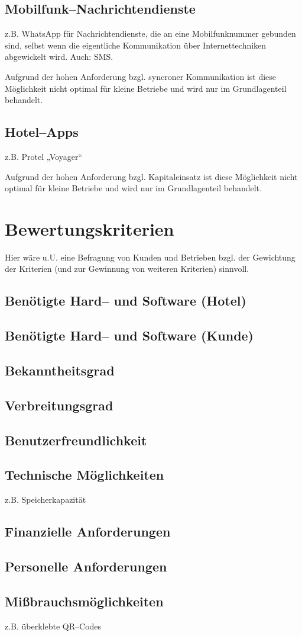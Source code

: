 \subsection{Mobilfunk--Nachrichtendienste}

z.B. WhatsApp für Nachrichtendienste, die an eine Mobilfunknummer gebunden sind, selbst wenn die eigentliche Kommunikation über Internettechniken abgewickelt wird. Auch: SMS.

Aufgrund der hohen Anforderung bzgl. syncroner Kommunikation ist diese Möglichkeit nicht optimal für kleine Betriebe und wird nur im Grundlagenteil behandelt.

\subsection{Hotel--Apps}

z.B. Protel „Voyager“

Aufgrund der hohen Anforderung bzgl. Kapitaleinsatz ist diese Möglichkeit nicht optimal für kleine Betriebe und wird nur im Grundlagenteil behandelt.

\section{Bewertungskriterien}
\label{sec:kriterien}

Hier wäre u.U. eine Befragung von Kunden und Betrieben bzgl. der Gewichtung der Kriterien (und zur Gewinnung von weiteren Kriterien) sinnvoll.

\subsection{Benötigte Hard-- und Software (Hotel)}
\subsection{Benötigte Hard-- und Software (Kunde)}
\subsection{Bekanntheitsgrad}
\subsection{Verbreitungsgrad}
\subsection{Benutzerfreundlichkeit}
\subsection{Technische Möglichkeiten}
z.B. Speicherkapazität

\subsection{Finanzielle Anforderungen}
\subsection{Personelle Anforderungen}
\subsection{Mißbrauchsmöglichkeiten}
z.B. überklebte QR--Codes